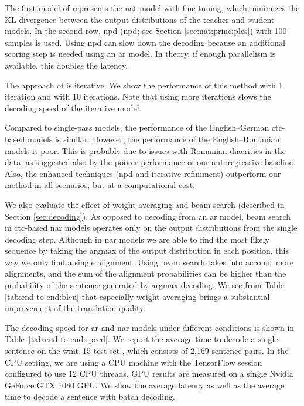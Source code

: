 The first model of \citet{gu2017nonautoregressive} represents the \ac{nat}
model with fine-tuning, which minimizes the KL divergence between the output
distributions of the teacher and student models. In the second row, \acl{npd}
(\acs{npd}; see Section \ref{sec:nat:principles}) with 100
samples is used. Using \ac{npd} can slow down the decoding because an
additional scoring step is needed using an \ac{ar} model. In theory, if enough
parallelism is available, this doubles the latency.

The approach of \citet{lee-etal-2018-deterministic} is iterative. We show the
performance of this method with 1 iteration and with 10 iterations. Note that
using more iterations slows the decoding speed of the iterative model.

Compared to single-pass models, the performance of the English--German
\acs{ctc}-based models is similar. However, the performance of the
English--Romanian models is poor. This is probably due to issues with Romanian
diacritics in the data, as suggested also by the poorer performance of our
autoregressive baseline. Also, the enhanced techniques (\ac{npd} and iterative
refiniment) outperform our method in all scenarios, but at a computational
cost.

We also evaluate the effect of weight averaging and beam search (described in
Section \ref{sec:decoding}). As opposed to decoding from an \ac{ar} model, beam
search in \acs{ctc}-based \ac{nar} models operates only on the output
distributions from the single decoding step. Although in \ac{nar} models we are
able to find the most likely sequence by taking the argmax of the output
distribution in each position, this way we only find a single alignment. Using
beam search takes into account more alignments, and the sum of the alignment
probabilities can be higher than the probability of the sentence generated by
argmax decoding. We see from Table \ref{tab:end-to-end:bleu} that especially
weight averaging brings a substantial improvement of the translation quality.

The decoding speed for \ac{ar} and \ac{nar} models under different conditions
is shown in Table~\ref{tab:end-to-end:speed}. We report the average time to
decode a single sentence on the \ac{wmt}~15 test set
\citep{bojar-etal-2015-findings}, which consists of 2,169 sentence pairs. In
the CPU setting, we are using a CPU machine with the TensorFlow session
configured to use 12 CPU threads. GPU results are measured on a single Nvidia
GeForce GTX 1080 GPU. We show the average latency as well as the average time
to decode a sentence with batch decoding.

